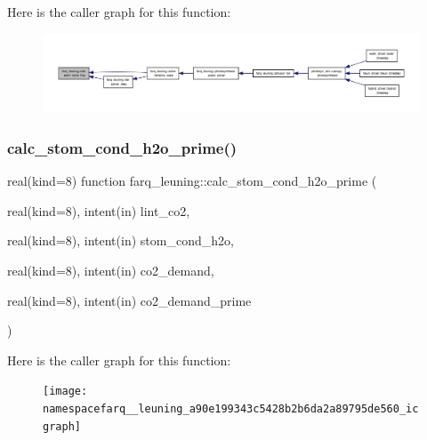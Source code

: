 Here is the caller graph for this function\+:
\nopagebreak
\begin{figure}[H]
\begin{center}
\leavevmode
\includegraphics[width=350pt]{namespacefarq__leuning_ae3bd8aaff5c63ef30cb1004d8a5c9639_icgraph}
\end{center}
\end{figure}
\mbox{\label{namespacefarq__leuning_a90e199343c5428b2b6da2a89795de560}} 
\subsubsection{\texorpdfstring{calc\+\_\+stom\+\_\+cond\+\_\+h2o\+\_\+prime()}{calc\_stom\_cond\_h2o\_prime()}}
{\footnotesize\ttfamily real(kind=8) function farq\+\_\+leuning\+::calc\+\_\+stom\+\_\+cond\+\_\+h2o\+\_\+prime (\begin{DoxyParamCaption}\item[{real(kind=8), intent(in)}]{lint\+\_\+co2,  }\item[{real(kind=8), intent(in)}]{stom\+\_\+cond\+\_\+h2o,  }\item[{real(kind=8), intent(in)}]{co2\+\_\+demand,  }\item[{real(kind=8), intent(in)}]{co2\+\_\+demand\+\_\+prime }\end{DoxyParamCaption})}

Here is the caller graph for this function\+:
\nopagebreak
\begin{figure}[H]
\begin{center}
\leavevmode
\texttt{[image: namespacefarq\_\_leuning\_a90e199343c5428b2b6da2a89795de560\_icgraph]}
\end{center}
\end{figure}
\mbox{\label{namespacefarq__leuning_ab284bec4bd11bda7c190c6ae2de979fb}} 
